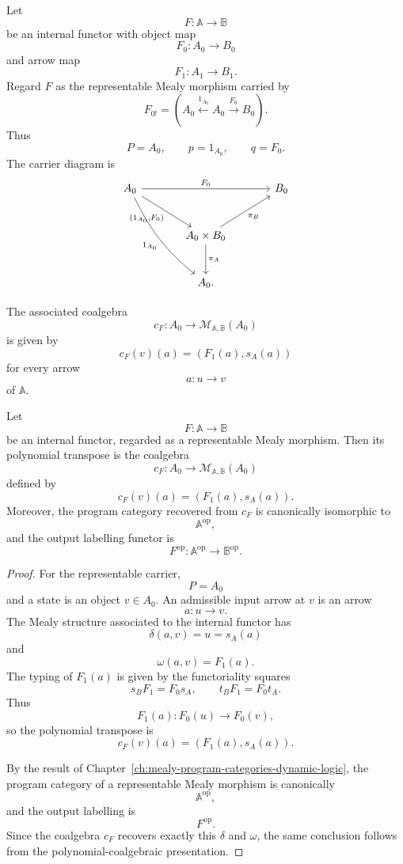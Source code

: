 Let
\[
F:\mathbb A\to\mathbb B
\]
be an internal functor with object map
\[
F_0:A_0\to B_0
\]
and arrow map
\[
F_1:A_1\to B_1.
\]
Regard \(F\) as the representable Mealy morphism carried by
\[
F_{0!}
=
\left(
A_0\xleftarrow{1_{A_0}}A_0\xrightarrow{F_0}B_0
\right).
\]
Thus
\[
P=A_0,
\qquad
p=1_{A_0},
\qquad
q=F_0.
\]
The carrier diagram is
\[
\begin{tikzcd}[column sep=large,row sep=large]
A_0
  \arrow[rr, "F_0"]
  \arrow[dr, "{(1_{A_0},F_0)}"']
  \arrow[ddr, "1_{A_0}"', bend right=12]
&&
B_0
\\
&
A_0\times B_0
  \arrow[ur, "\pi_B"']
  \arrow[d, "\pi_A"]
&
\\
&
A_0 .
\end{tikzcd}
\]

The associated coalgebra
\[
c_F:A_0\to\mathcal M_{\mathbb A,\mathbb B}(A_0)
\]
is given by
\[
c_F(v)(a)=(F_1(a),s_A(a))
\]
for every arrow
\[
a:u\to v
\]
of \(\mathbb A\).

\begin{theorem}
\label{thm:representable-mealy-coalgebras}
Let
\[
F:\mathbb A\to\mathbb B
\]
be an internal functor, regarded as a representable Mealy morphism. Then
its polynomial transpose is the coalgebra
\[
c_F:A_0\to\mathcal M_{\mathbb A,\mathbb B}(A_0)
\]
defined by
\[
c_F(v)(a)=(F_1(a),s_A(a)).
\]
Moreover, the program category recovered from \(c_F\) is canonically
isomorphic to
\[
\mathbb A^{\mathrm{op}},
\]
and the output labelling functor is
\[
F^{\mathrm{op}}:\mathbb A^{\mathrm{op}}\to\mathbb B^{\mathrm{op}}.
\]
\end{theorem}

\begin{proof}
For the representable carrier,
\[
P=A_0
\]
and a state is an object \(v\in A_0\). An admissible input arrow at \(v\)
is an arrow
\[
a:u\to v.
\]
The Mealy structure associated to the internal functor has
\[
\delta(a,v)=u=s_A(a)
\]
and
\[
\omega(a,v)=F_1(a).
\]
The typing of \(F_1(a)\) is given by the functoriality squares
\[
s_BF_1=F_0s_A,
\qquad
t_BF_1=F_0t_A.
\]
Thus
\[
F_1(a):F_0(u)\to F_0(v),
\]
so the polynomial transpose is
\[
c_F(v)(a)=(F_1(a),s_A(a)).
\]

By the result of Chapter~\ref{ch:mealy-program-categories-dynamic-logic},
the program category of a representable Mealy morphism is canonically
\[
\mathbb A^{\mathrm{op}},
\]
and the output labelling is
\[
F^{\mathrm{op}}.
\]
Since the coalgebra \(c_F\) recovers exactly this \(\delta\) and
\(\omega\), the same conclusion follows from the polynomial-coalgebraic
presentation.
\end{proof}

